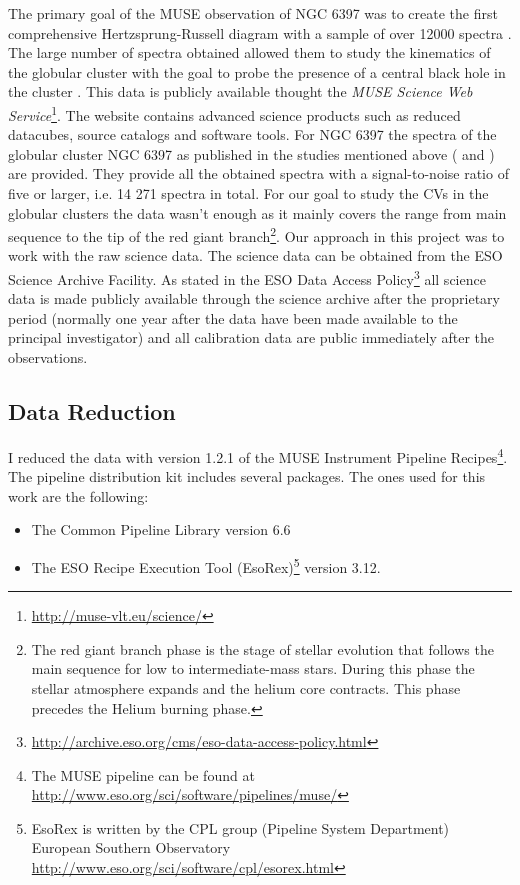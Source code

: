 The primary goal of the MUSE observation of NGC 6397 was to create the first comprehensive Hertzsprung-Russell diagram with a sample of over 12000 spectra \citep{husser_muse_2016}. The large number of spectra obtained allowed them to study the kinematics of the globular cluster with the goal to probe the presence of a central black hole in the cluster \citep{kamann_muse_2016}. This data is publicly available thought the \emph{MUSE Science Web Service}\footnote{\url{http://muse-vlt.eu/science/}}. The website contains advanced science products such as reduced datacubes, source catalogs and software tools. For NGC 6397 the spectra of the globular cluster NGC 6397 as published in the studies mentioned above (\citealp{husser_muse_2016} and \citealp{kamann_muse_2016}) are provided. They provide all the obtained spectra with a signal-to-noise ratio of five or larger, i.e. 14 271 spectra in total. For our goal to study the CVs in the globular clusters the data wasn't enough as it mainly covers the range from main sequence to the tip of the red giant branch\footnote{The red giant branch phase is the stage of stellar evolution that follows the main sequence for low to intermediate-mass stars. During this phase the stellar atmosphere expands and the helium core contracts. This phase precedes the Helium burning phase. }. Our approach in this project was to work with the raw science data. The science data can be obtained from the ESO  Science Archive Facility. As stated in the ESO Data Access Policy\footnote{\url{http://archive.eso.org/cms/eso-data-access-policy.html}} all science data is made publicly available through the science archive after the proprietary period (normally one year after the data have been made available to the principal investigator) and all calibration data are public immediately after the observations.  

\subsection{Data Reduction}

I reduced the data with version 1.2.1 of the MUSE Instrument Pipeline Recipes\footnote{The MUSE pipeline can be found at \url{http://www.eso.org/sci/software/pipelines/muse/}}\citep{weilbacher_design_2012}. The pipeline distribution kit includes several packages. The ones used for this work are the following:

\begin{itemize}
        \item The Common Pipeline Library version 6.6 \citep{mckay_common_2004}
        \item The ESO Recipe Execution Tool (EsoRex)\footnote{EsoRex is written by the CPL group (Pipeline System Department) European Southern Observatory \url{http://www.eso.org/sci/software/cpl/esorex.html}} version 3.12.
\end{itemize}

